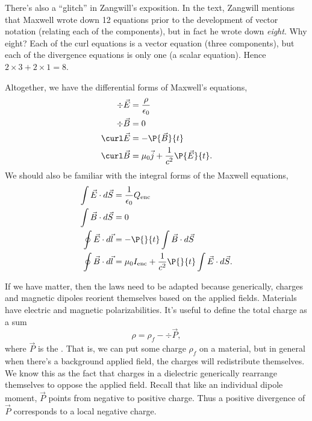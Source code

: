 There's also a ``glitch'' in Zangwill's exposition. In the text, Zangwill mentions that Maxwell wrote down 12 equations prior to the development of vector notation (relating each of the components), but in fact he wrote down \emph{eight}. Why eight? Each of the curl equations is a vector equation (three components), but each of the divergence equations is only one (a scalar equation). Hence $2\times 3 + 2\times 1 = 8$.

Altogether, we have the differential forms of Maxwell's equations,
\begin{subequations}
\begin{align}
    \div \vec{E} &= \frac{\rho}{\epsilon_0}\\
    \div \vec{B} &= 0\\
    \curl \vec{E} &= -\P{\vec{B}}{t}\\
    \curl \vec{B} &= \mu_0\vec{j} + \frac{1}{c^2}\P{\vec{E}}{t}.
\end{align}
\end{subequations}
%
We should also be familiar with the integral forms of the Maxwell equations,
\begin{subequations}
\begin{align}
    \int \vec{E} \cdot d\vec{S} &= \frac{1}{\epsilon_0} Q_\text{enc}\\
    \int \vec{B} \cdot d\vec{S} &=0\\
    \oint \vec{E} \cdot d\vec{l} &= -\P{}{t} \int \vec{B} \cdot d\vec{S}\\
    \oint \vec{B} \cdot d\vec{l} &= \mu_0 I_\text{enc}+ \frac{1}{c^2} \P{}{t}\int \vec{E} \cdot d\vec{S}.
\end{align}
\end{subequations}

If we have matter, then the laws need to be adapted because generically, charges and magnetic dipoles reorient themselves based on the applied fields. Materials have electric and magnetic polarizabilities. It's useful to define the total charge as a sum
\begin{equation}
    \rho = \rho_f - \div \vec{P},
\end{equation}
where $\vec{P}$ is the . That is, we can put some charge $\rho_f$ on a material, but in general when there's a background applied field, the charges will redistribute themselves. We know this as the fact that charges in a dielectric generically rearrange themselves to oppose the applied field. Recall that like an individual dipole moment, $\vec{P}$ points from negative to positive charge. Thus a positive divergence of $\vec{P}$ corresponds to a local negative charge.

